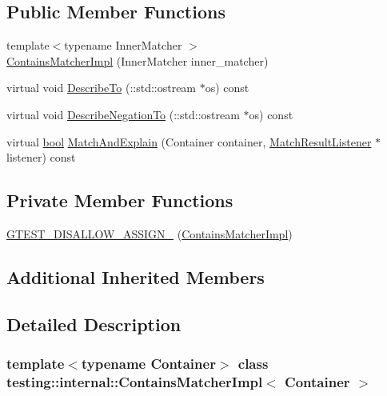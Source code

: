 \subsection*{Public Member Functions}
\begin{DoxyCompactItemize}
\item 
{\footnotesize template$<$typename Inner\+Matcher $>$ }\\\hyperlink{classtesting_1_1internal_1_1ContainsMatcherImpl_a3fd56f21081068101a76ebe05fc1d7f4}{Contains\+Matcher\+Impl} (Inner\+Matcher inner\+\_\+matcher)
\item 
virtual void \hyperlink{classtesting_1_1internal_1_1ContainsMatcherImpl_af47e4e9f890d64e7f8abcdf3f5fb8b3e}{Describe\+To} (\+::std\+::ostream $\ast$os) const
\item 
virtual void \hyperlink{classtesting_1_1internal_1_1ContainsMatcherImpl_a9d7867110ba3f346399f23e41cc75c5b}{Describe\+Negation\+To} (\+::std\+::ostream $\ast$os) const
\item 
virtual \hyperlink{classbool}{bool} \hyperlink{classtesting_1_1internal_1_1ContainsMatcherImpl_a1cb9f1d2da48bd4a48c281215f8f94e9}{Match\+And\+Explain} (Container container, \hyperlink{classtesting_1_1MatchResultListener}{Match\+Result\+Listener} $\ast$listener) const
\end{DoxyCompactItemize}
\subsection*{Private Member Functions}
\begin{DoxyCompactItemize}
\item 
\hyperlink{classtesting_1_1internal_1_1ContainsMatcherImpl_a19d1ac43ca3833e25fedac4ed7014e3d}{G\+T\+E\+S\+T\+\_\+\+D\+I\+S\+A\+L\+L\+O\+W\+\_\+\+A\+S\+S\+I\+G\+N\+\_\+} (\hyperlink{classtesting_1_1internal_1_1ContainsMatcherImpl}{Contains\+Matcher\+Impl})
\end{DoxyCompactItemize}
\subsection*{Additional Inherited Members}


\subsection{Detailed Description}
\subsubsection*{template$<$typename Container$>$\newline
class testing\+::internal\+::\+Contains\+Matcher\+Impl$<$ Container $>$}



